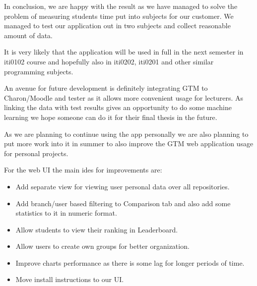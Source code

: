 In conclusion, we are happy with the result as we have managed to solve the problem of measuring students time
put into subjects for our customer.
We managed to test our application out in two subjects and collect reasonable amount of data.

It is very likely that the application will be used in full in the next semester in iti0102 course and hopefully also in
iti0202, iti0201 and other similar programming subjects.

An avenue for future development is definitely integrating GTM to Charon/Moodle and tester as it allows more convenient usage for lecturers.
As linking the data with test results gives an opportunity to do some machine learning we hope someone can do it for their final thesis in the future.

As we are planning to continue using the app personally we are also planning to put more work into it in summer to
also improve the GTM web application usage for personal projects.

For the web UI the main ides for improvements are:
\begin{itemize}
    \item Add separate view for viewing user personal data over all repositories.
    \item Add branch/user based filtering to Comparison tab and also add some statistics to it in numeric format.
    \item Allow students to view their ranking in Leaderboard.
    \item Allow users to create own groups for better organization.
    \item Improve charts performance as there is some lag for longer periods of time.
    \item Move install instructions to our UI.
\end{itemize}

